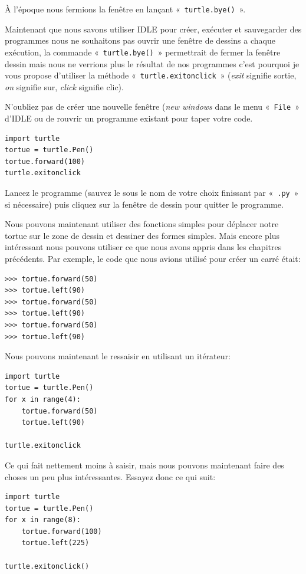 À l'époque nous fermions la fenêtre en lançant « \texttt{turtle.bye()} ».

Maintenant que nous savons utiliser IDLE pour créer, exécuter et sauvegarder des programmes nous ne souhaitons pas ouvrir une  fenêtre de dessins a chaque exécution, la commande « \texttt{turtle.bye()} » permettrait de fermer la fenêtre dessin mais nous ne verrions plus le résultat de nos programmes c'est pourquoi je vous propose d'utiliser 
la méthode « \texttt{turtle.exitonclick} »  (\emph{exit} signifie sortie, \emph{on} signifie sur, \emph{click} signifie clic).

N'oubliez pas de créer une nouvelle fenêtre (\emph{new windows} dans le menu « \texttt{File} » d'IDLE ou de rouvrir un programme existant pour taper votre code.

\begin{Verbatim}[frame=single,rulecolor=\color{mbleu}, label=à taper]
import turtle
tortue = turtle.Pen()
tortue.forward(100)
turtle.exitonclick
\end{Verbatim}

Lancez le programme (sauvez le sous le nom de votre choix finissant par « \texttt{.py} » si nécessaire) puis cliquez sur la fenêtre de dessin pour quitter le programme.

Nous pouvons maintenant utiliser des fonctions simples pour déplacer notre tortue sur le zone de dessin et dessiner des formes simples. Mais encore plus intéressant nous pouvons utiliser ce que nous avons appris dans les chapitres précédents. Par exemple, le code que nous avions utilisé pour créer un carré était:

\begin{Verbatim}[frame=single,rulecolor=\color{gray}, label=ne pas saisir]
>>> tortue.forward(50)
>>> tortue.left(90)
>>> tortue.forward(50)
>>> tortue.left(90)
>>> tortue.forward(50)
>>> tortue.left(90)
\end{Verbatim}

Nous pouvons maintenant le ressaisir en utilisant un itérateur:

\begin{Verbatim}[frame=single,rulecolor=\color{mbleu}, label=à taper]
import turtle
tortue = turtle.Pen()
for x in range(4):
    tortue.forward(50)
    tortue.left(90)
    
turtle.exitonclick
\end{Verbatim}

Ce qui fait nettement moins à saisir, mais nous pouvons maintenant faire des choses un peu plus intéressantes. Essayez donc ce qui suit:
\begin{Verbatim}[frame=single,rulecolor=\color{mbleu}, label=à taper]
import turtle
tortue = turtle.Pen()
for x in range(8):
    tortue.forward(100)
    tortue.left(225)
    
turtle.exitonclick()
\end{Verbatim}

